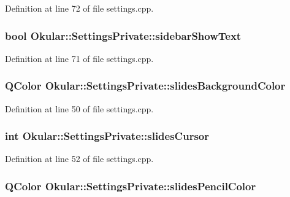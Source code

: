 Definition at line 72 of file settings.\+cpp.

\hypertarget{classOkular_1_1SettingsPrivate_aa08cf64b458c6e54684a87ca6705501c}{
\subsubsection[{sidebar\+Show\+Text}]{\setlength{\rightskip}{0pt plus 5cm}bool Okular\+::\+Settings\+Private\+::sidebar\+Show\+Text}}\label{classOkular_1_1SettingsPrivate_aa08cf64b458c6e54684a87ca6705501c}


Definition at line 71 of file settings.\+cpp.

\hypertarget{classOkular_1_1SettingsPrivate_a11f64298e45757b748004b576448cf5b}{
\subsubsection[{slides\+Background\+Color}]{\setlength{\rightskip}{0pt plus 5cm}Q\+Color Okular\+::\+Settings\+Private\+::slides\+Background\+Color}}\label{classOkular_1_1SettingsPrivate_a11f64298e45757b748004b576448cf5b}


Definition at line 50 of file settings.\+cpp.

\hypertarget{classOkular_1_1SettingsPrivate_ad929dff4ddff7595b0f4c50bdbd4c091}{
\subsubsection[{slides\+Cursor}]{\setlength{\rightskip}{0pt plus 5cm}int Okular\+::\+Settings\+Private\+::slides\+Cursor}}\label{classOkular_1_1SettingsPrivate_ad929dff4ddff7595b0f4c50bdbd4c091}


Definition at line 52 of file settings.\+cpp.

\hypertarget{classOkular_1_1SettingsPrivate_af415c5e60b769ab43abd82ff9925be41}{
\subsubsection[{slides\+Pencil\+Color}]{\setlength{\rightskip}{0pt plus 5cm}Q\+Color Okular\+::\+Settings\+Private\+::slides\+Pencil\+Color}}\label{classOkular_1_1SettingsPrivate_af415c5e60b769ab43abd82ff9925be41}


